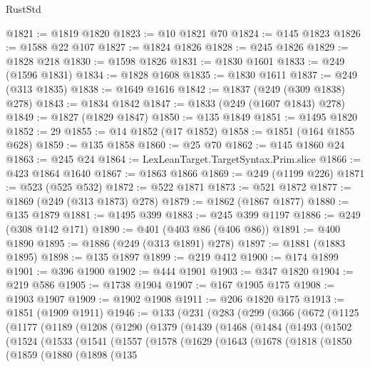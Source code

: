 \begin{lexlean}{RustStd}
\begin{coremodule}
{\begin{coremodule}
{{{{{{{{{{{{{{{{{{{{{{{{{{{{{{{{{{@1821 := @1819 @1820
@1823 := @10 @1821 @70
@1824 := @145 @1823
@1826 := @1588 @22 @107
@1827 := @1824 @1826
@1828 := @245 @1826
@1829 := @1828 @218
@1830 := @1598 @1826
@1831 := @1830 @1601
@1833 := @249 (@1596 @1831)
@1834 := @1828 @1608
@1835 := @1830 @1611
@1837 := @249 (@313 @1835)
@1838 := @1649 @1616
@1842 := @1837 (@249 (@309 @1838) @278)
@1843 := @1834 @1842
@1847 := @1833 (@249 (@1607 @1843) @278)
@1849 := @1827 (@1829 @1847)
@1850 := @135 @1849
@1851 := @1495 @1820
@1852 := 29
@1855 := @14 @1852 (@17 @1852)
@1858 := @1851 (@164 @1855 @628)
@1859 := @135 @1858
@1860 := @25 @70
@1862 := @145 @1860 @24
@1863 := @245 @24
@1864 := LexLeanTarget.TargetSyntax.Prim.slice
@1866 := @423 @1864 @1640
@1867 := @1863 @1866
@1869 := @249 (@1199 @226)
@1871 := @523 (@525 @532)
@1872 := @522 @1871
@1873 := @521 @1872
@1877 := @1869 (@249 (@313 @1873) @278)
@1879 := @1862 (@1867 @1877)
@1880 := @135 @1879
@1881 := @1495 @399
@1883 := @245 @399 @1197
@1886 := @249 (@308 @142 @171)
@1890 := @401 (@403 @86 (@406 @86))
@1891 := @400 @1890
@1895 := @1886 (@249 (@313 @1891) @278)
@1897 := @1881 (@1883 @1895)
@1898 := @135 @1897
@1899 := @219 @412
@1900 := @174 @1899
@1901 := @396 @1900
@1902 := @444 @1901
@1903 := @347 @1820
@1904 := @219 @586
@1905 := @1738 @1904
@1907 := @167 @1905 @175
@1908 := @1903 @1907
@1909 := @1902 @1908
@1911 := @206 @1820 @175
@1913 := @1851 (@1909 @1911)
@1946 := @133
    (@231
      (@283
        (@299
          (@366
            (@672
              (@1125
                (@1177
                  (@1189
                    (@1208
                      (@1290
                        (@1379
                          (@1439
                            (@1468
                              (@1484
                                (@1493
                                  (@1502
                                    (@1524
                                      (@1533
                                        (@1541
                                          (@1557
                                            (@1578
                                              (@1629
                                                (@1643
                                                  (@1678
                                                    (@1818
                                                      (@1850
                                                        (@1859
                                                          (@1880
                                                            (@1898
                                                              (@135
}}}}}}}}}}}}}}}}}}}}}}}}}}}}}}}}}}
\end{coremodule}}
\end{coremodule}
\end{lexlean}
